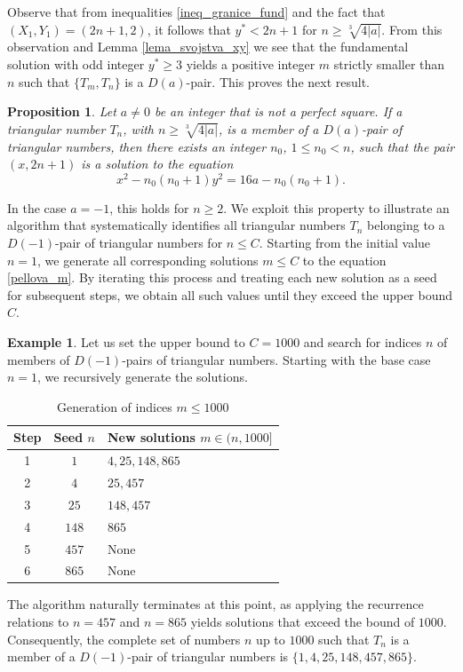 \documentclass[12pt]{amsart}
\newtheorem{proposition}[theorem]{Proposition}
\theoremstyle{definition}
\newtheorem*{example}{Example}
\begin{document}
Observe that from inequalities \eqref{ineq_granice_fund} and the fact that $(X_1,Y_1)=(2n+1,2)$, it follows that $y^*<2n+1$ for $n\geq \sqrt[3]{4|a|}$. From this observation and Lemma \ref{lema_svojstva_xy} we see that the fundamental solution with odd integer $y^*\geq 3$ yields a positive integer $m$ strictly smaller than $n$ such that $\{T_m,T_n\}$ is a $D(a)$-pair. This proves the next result. 

  \begin{proposition}
    Let $a\neq 0$ be an integer that is not a perfect square. 
    If a triangular number $T_n$, with $n \geq \sqrt[3]{4|a|}$, is a member of a $D(a)$-pair of triangular numbers, then there exists an integer $n_0$, $1 \leq n_0 < n$, such that the pair $(x,2n+1)$ is a solution to the equation $$x^2 - n_0(n_0+1)y^2 = 16a - n_0(n_0+1).$$
\end{proposition}
\medskip 

In the case $a=-1$, this holds for $n\geq 2$. 
 We exploit this property to illustrate an algorithm that systematically identifies all triangular numbers $T_n$ belonging to a $D(-1)$-pair of triangular numbers for $n \leq C$. Starting from the initial value $n=1$, we generate all corresponding solutions $m \leq C$ to the equation \eqref{pellova_m}. By iterating this process and treating each new solution as a seed for subsequent steps, we obtain all such values until they exceed the upper bound $C$.


\begin{example}
Let us set the upper bound to $C=1000$ and search for indices $n$ of members of $D(-1)$-pairs of triangular numbers. Starting with the base case $n=1$, we recursively generate the solutions. 

\begin{table}[h!]
\centering
\caption{Generation of indices $m \leq 1000$ }
\label{table_iteracije}
\renewcommand{\arraystretch}{1.3}
\begin{tabular}{|c|c|l|}
\hline
\textbf{Step} & \textbf{Seed $n$} & \textbf{New solutions $m \in (n, 1000]$} \\
\hline
1 & $1$ & $4, 25, 148, 865$ \\
\hline
2 & $4$ & $25, 457$ \\
\hline
3 & $25$ & $148, 457$ \\
\hline
4 & $148$ & $865$ \\
\hline
5 & $457$ & None \\
\hline
6 & $865$ & None \\
\hline
\end{tabular}
\end{table}

The algorithm naturally terminates at this point, as applying the recurrence relations to $n=457$ and $n=865$ yields solutions that exceed the bound of $1000$. Consequently, the complete set of numbers $n$ up to $1000$ such that $T_n$ is a member of a $D(-1)$-pair of triangular numbers is $\{1, 4, 25, 148, 457, 865\}$. 
\end{example}
\end{document}
